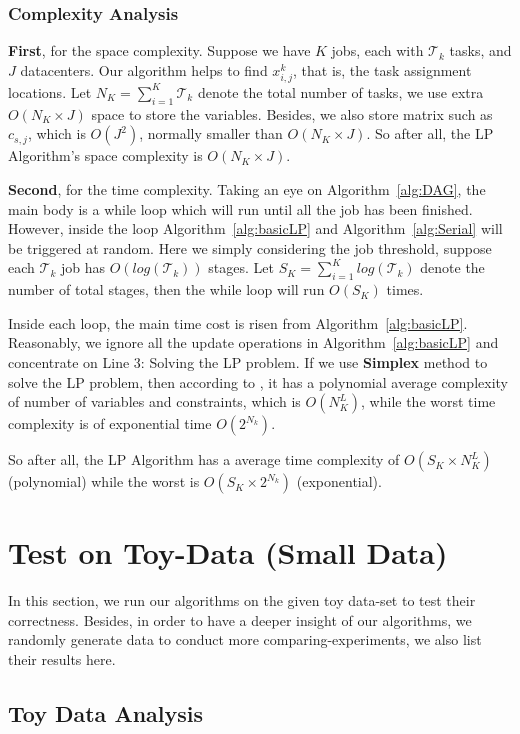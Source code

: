\documentclass{llncs}
\begin{document}
\subsubsection{Complexity Analysis}
\;

{\bf First}, for the space complexity. Suppose we have $K$ jobs, each with $\mathcal{T}_k$ tasks, and $J$ datacenters. Our algorithm helps to find $x_{i,j}^k$, that is, the task assignment locations. Let $N_K = \sum_{i=1}^K \mathcal{T}_k$ denote the total number of tasks, we use extra $O(N_K \times J)$ space to store the variables. Besides, we also store matrix such as $c_{s,j}$, which is $O(J^2)$, normally smaller than $O(N_K \times J)$. So after all, the LP Algorithm's space complexity is $O(N_K \times J)$.

{\bf Second}, for the time complexity. Taking an eye on Algorithm~\ref{alg:DAG}, the main body is a while loop which will run until all the job has been finished. However, inside the loop Algorithm~\ref{alg:basicLP} and Algorithm~\ref{alg:Serial} will be triggered at random. Here we simply considering the job threshold, suppose each $\mathcal{T}_k$ job has $O(log(\mathcal{T}_k))$ stages. Let $S_K = \sum_{i=1}^K log(\mathcal{T}_k)$ denote the number of total stages, then the while loop will run $O(S_K)$ times.

Inside each loop, the main time cost is risen from Algorithm~\ref{alg:basicLP}. Reasonably, we ignore all the update operations in Algorithm~\ref{alg:basicLP} and concentrate on Line 3: Solving the LP problem. If we use {\bf Simplex} method to solve the LP problem, then according to \cite{ref_13}, it has a polynomial average complexity of number of variables and constraints, which is $O(N_K^L)$, while the worst time complexity is of exponential time $O(2^{N_k})$.

So after all, the LP Algorithm has a average time complexity of $O(S_K \times N_K^L)$ (polynomial) while the worst is $O(S_K \times 2^{N_k})$ (exponential).

\section{Test on Toy-Data (Small Data)}
In this section, we run our algorithms on the given toy data-set to test their correctness. Besides, in order to have a deeper insight of our algorithms, we randomly generate data to conduct more comparing-experiments, we also list their results here.
\subsection{Toy Data Analysis}
\end{document}
